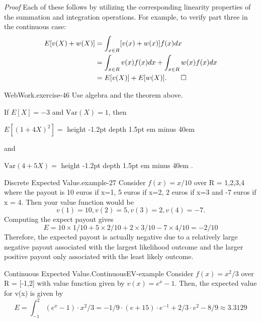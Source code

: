\documentclass[10pt,]{book}
\makeatletter
\newcommand{\fillin}[1]{\leavevmode\leaders\vrule height -1.2pt depth 1.5pt \hskip #1em minus #1em \null}
\renewcommand*{\proofname}{Proof}
\renewenvironment{proof}[1][\proofname]{\par
  \pushQED{\qed}%
  \normalfont \topsep6\p@\@plus6\p@\relax
  \trivlist
  \item\relax
    {\itshape
    #1\@addpunct{.}}\hspace\labelsep\ignorespaces
}{%
  \popQED\endtrivlist\@endpefalse
}
\numberwithin{equation}{section}
\makeatother
\begin{document}
\begin{proof}\hypertarget{proof-31}{}
\hypertarget{p-715}{}%
Each of these follows by utilizing the corresponding linearity properties of the summation and integration operations. For example, to verify part three in the continuous case:%
\begin{align*}
E[v(X) + w(X)] & = \int_{x \in R} [v(x)+w(x)]f(x) dx\\
& = \int_{x \in R} v(x)f(x) dx + \int_{x \in R} w(x)f(x) dx\\
& = E[v(X)] + E[w(X)].\qedhere
\end{align*}
%
\end{proof}
%
\par
\hypertarget{p-716}{}%
\begin{inlineexercise}{WebWork.}{exercise-46}%
\hypertarget{p-717}{}%
Use algebra and the theorem above.%
\par\medskip
\hypertarget{p-718}{}%
If \(E[X]=-3\) and \(\mbox{Var}(X) = 1\), then%
\par
\hypertarget{p-719}{}%
\(E[(1 + 4 X)^2] =\) \fillin{40}%
\par
\hypertarget{p-720}{}%
and%
\par
\hypertarget{p-721}{}%
\(\mbox{Var}(4 + 5 X) =\) \fillin{40}.%
\end{inlineexercise}
%
\par
\hypertarget{p-722}{}%
\begin{example}{Discrete Expected Value.}{example-27}%
\hypertarget{p-723}{}%
Consider \(f(x) = x/10\) over R = {1,2,3,4} where the payout is 10 euros if x=1, 5 euros if x=2, 2 euros if x=3 and -7 euros if x = 4.  Then your value function would be%
\begin{equation*}
v(1)=10, v(2) = 5, v(3)=2, v(4) = -7.
\end{equation*}
Computing the expect payout gives%
\begin{equation*}
E = 10 \times 1/10 + 5 \times 2/10 + 2 \times 3/10 - 7 \times 4/10 = -2/10
\end{equation*}
Therefore, the expected payout is actually negative due to a relatively large negative payout associated with the largest likelihood outcome and the larger positive payout only associated with the least likely outcome.%
\end{example}
%
\par
\hypertarget{p-724}{}%
\begin{example}{Continuous Expected Value.}{ContinuousEV-example}%
\hypertarget{p-725}{}%
Consider \(f(x) = x^2/3\) over R = [-1,2] with value function given by \(v(x) = e^x - 1\). Then, the expected value for v(x) is given by%
\begin{equation*}
E = \int_{-1}^2 (e^x-1) \cdot x^2/3 = -1/9 \cdot (e + 15) \cdot e^{-1} + 2/3 \cdot e^2 - 8/9 \approx 3.3129
\end{equation*}
%
\end{example}
\end{document}
